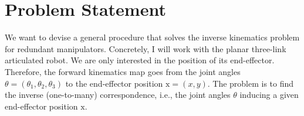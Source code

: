 \section{Problem Statement}
%
%
We want to devise a general procedure that solves the inverse kinematics problem
for redundant manipulators. Concretely, I will work with the planar three-link
articulated robot. We are only interested in the position of its end-effector.
Therefore, the forward kinematics map goes from the joint angles $\theta =
(\theta_1, \theta_2, \theta_3)$ to the end-effector position $\mathrm{x} =
(x,y)$. The problem is to find the inverse (one-to-many) correspondence, i.e.,
the joint angles $\theta$ inducing a given end-effector position $\mathrm{x}$.